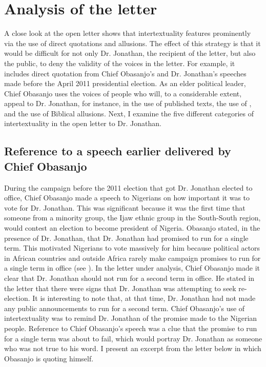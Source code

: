 \documentclass[output=paper,colorlinks,citecolor=brown]{langscibook}
\begin{document}
\section{Analysis of the letter}

A close look at the open letter shows that intertextuality features prominently via the use of direct quotations  and  allusions. The effect of this strategy is that it would be difficult for not only Dr. Jonathan, the recipient of the letter, but also the public, to deny the validity of the voices in the letter. For example, it includes direct quotation from Chief Obasanjo's and Dr. Jonathan’s speeches made before the April 2011 presidential election. As an elder political leader, Chief Obasanjo uses the voices of people who will, to a considerable extent, appeal to Dr. Jonathan, for instance, in the use of published texts, the use of , and the use of Biblical allusions. Next, I examine the five different categories of intertextuality in the open letter to Dr. Jonathan. 

\subsection{Reference to a speech earlier delivered by Chief Obasanjo}

During the campaign before the 2011 election that got Dr. Jonathan elected to office, Chief Obasanjo made a speech to Nigerians on how important it was to vote for Dr. Jonathan. This was significant because it was the first time that someone from a minority group, the Ijaw ethnic group in the South-South region, would contest an election to become president of Nigeria. Obasanjo stated, in the presence of Dr. Jonathan, that Dr. Jonathan had promised to run for a single term. This motivated Nigerians to vote massively for him because political actors in African countries and outside Africa rarely make campaign promises to run for a single term in office (see \cite{PapaioannouandVanZanden2015}). In the letter under analysis, Chief Obasanjo made it clear that Dr. Jonathan should not run for a second term in office. He stated in the letter that there were signs that Dr. Jonathan was attempting to seek re-election. It is interesting to note that, at that time, Dr. Jonathan had not made any public announcements to run for a second term. Chief Obasanjo’s use of intertextuality was to remind Dr. Jonathan of the promise made to the Nigerian people. Reference to Chief Obasanjo’s speech was a clue that the promise to run for a single term was about to fail, which would portray Dr. Jonathan as someone who was not true to his word. I present an excerpt from the letter below in which Obasanjo is quoting himself.
\end{document}
